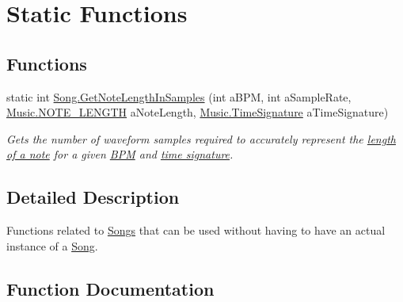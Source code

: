 \hypertarget{group___song_stat_func}{}\section{Static Functions}
\label{group___song_stat_func}
\subsection*{Functions}
\begin{DoxyCompactItemize}
\item 
static int \hyperlink{group___song_stat_func_ga03712f6defbff25d5a1cd964e4bc3211}{Song.\+Get\+Note\+Length\+In\+Samples} (int a\+B\+PM, int a\+Sample\+Rate, \hyperlink{group___music_enums_gaf11b5f079adbb21c800b9eca1c5c3cbd}{Music.\+N\+O\+T\+E\+\_\+\+L\+E\+N\+G\+TH} a\+Note\+Length, \hyperlink{group___music_structs_struct_music_1_1_time_signature}{Music.\+Time\+Signature} a\+Time\+Signature)
\begin{DoxyCompactList}\small\item\em Gets the number of waveform samples required to accurately represent the \hyperlink{group___music_enums_gaf11b5f079adbb21c800b9eca1c5c3cbd}{length of a note} for a given \hyperlink{group___audio_DefBPM}{B\+PM} and \hyperlink{group___music_structs_struct_music_1_1_time_signature}{time signature}. \end{DoxyCompactList}\end{DoxyCompactItemize}


\subsection{Detailed Description}
Functions related to \hyperlink{class_song}{Songs} that can be used without having to have an actual instance of a \hyperlink{class_song}{Song}. 

\subsection{Function Documentation}
\mbox{\label{group___song_stat_func_ga03712f6defbff25d5a1cd964e4bc3211}} 
